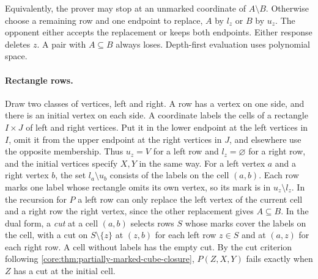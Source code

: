Equivalently, the prover may stop at an unmarked coordinate of $A\setminus B$.
Otherwise choose a remaining row and one endpoint to replace, $A$ by $l_z$
or $B$ by $u_z$. The opponent either accepts the replacement or keeps both
endpoints. Either response deletes $z$. A pair with $A\subseteq B$ always loses.
Depth-first evaluation uses polynomial space.

\paragraph{Rectangle rows.}
Draw two classes of vertices, left and right. A row has a vertex on one
side, and there is an initial vertex on each side. A coordinate labels the
cells of a rectangle $I\times J$ of left and right vertices. Put it in the
lower endpoint at the left vertices in $I$, omit it from the upper endpoint
at the right vertices in $J$, and elsewhere use the opposite membership.
Thus $u_z=V$ for a left row and $l_z=\varnothing$ for a right row, and the
initial vertices specify $X,Y$ in the same way. For a left vertex $a$ and
a right vertex $b$, the set $l_a\setminus u_b$ consists of the labels on
the cell $(a,b)$. Each row marks one label whose rectangle omits its own
vertex, so its mark is in $u_z\setminus l_z$. In the recursion for $P$ a
left row can only replace the left vertex of the current cell and a right
row the right vertex, since the other replacement gives $A\subseteq B$.
In the dual form, a \emph{cut} at a cell $(a,b)$ selects rows $S$ whose
marks cover the labels on the cell, with a cut on $S\setminus\{z\}$ at
$(z,b)$ for each left row $z\in S$ and at $(a,z)$ for each right row. A
cell without labels has the empty cut. By the cut criterion following
\cref{core:thm:partially-marked-cube-closure}, $P(Z,X,Y)$ fails exactly
when $Z$ has a cut at the initial cell.

